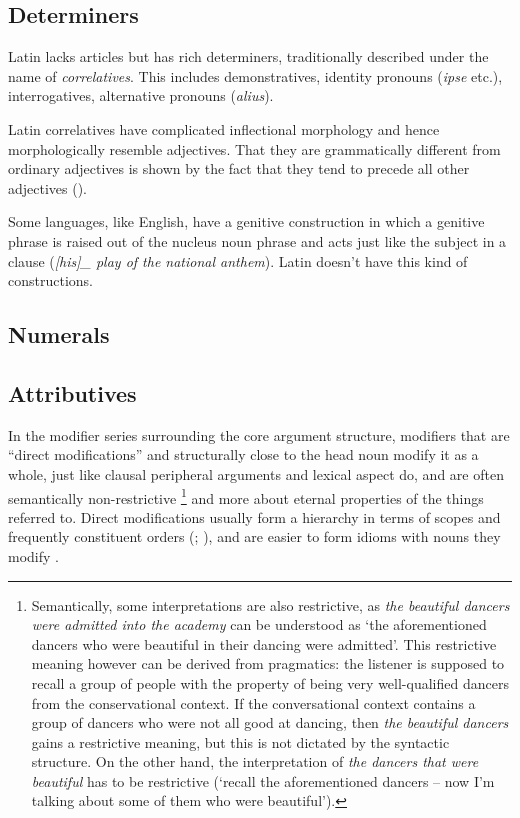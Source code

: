 \documentclass[a4paper, oneside, 12pt]{report}
\newcommand*{\citepage}[1]{p.~{#1}}
\newcommand*{\citepages}[1]{pp.~{#1}}
\newcommand*{\term}[1]{\emph{#1}}
\newcommand{\form}[1]{\emph{#1}}
\newcommand{\translate}[1]{`#1'}
\begin{document}
\subsection{Determiners}\label{sec:grammatical.np.determiner}

Latin lacks articles but has rich determiners,
traditionally described under the name of \term{correlatives}.
This includes demonstratives, identity pronouns (\form{ipse} etc.), interrogatives, alternative pronouns (\form{alius}).

Latin correlatives have complicated inflectional morphology and hence morphologically resemble adjectives.
That they are grammatically different from ordinary adjectives is shown by the fact that they tend to precede all other adjectives ().

Some languages, like English, have a genitive construction 
in which a genitive phrase is raised out of the nucleus noun phrase
and acts just like the subject in a clause (\form{[his]_{} play of the national anthem}).
Latin doesn't have this kind of constructions.

\subsection{Numerals}



\subsection{Attributives}

In the modifier series surrounding the core argument structure, 
modifiers that are ``direct modifications'' and structurally close to the head noun modify it as a whole,
just like clausal peripheral arguments and lexical aspect do,
and are often semantically non-restrictive%
\footnote{
    Semantically, some interpretations are also restrictive,
    as \form{the beautiful dancers were admitted into the academy}
    can be understood as \translate{the aforementioned dancers who were beautiful in their dancing were admitted}.
    This restrictive meaning however can be derived from pragmatics:
    the listener is supposed to recall a group of people with the property of being very well-qualified dancers from the conservational context.
    If the conversational context contains a group of dancers who were not all good at dancing,
    then \form{the beautiful dancers} gains a restrictive meaning,
    but this is not dictated by the syntactic structure. 
    On the other hand, the interpretation of \form{the dancers that were beautiful}
    has to be restrictive (\translate{recall the aforementioned dancers -- now I'm talking about some of them who were beautiful}).
}
and more about eternal properties of the things referred to.
Direct modifications usually form a hierarchy in terms of scopes and frequently constituent orders
(\citealt[\citepage{453}, {[10]}]{cgel}; \citealt[\citepages{25-34}]{cinque2010syntax}),
and are easier to form idioms with nouns they modify 
\citep[\citepage{108}]{cinque2010syntax}.
\end{document}
